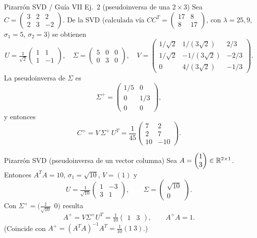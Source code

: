 \begin{ejemplo}{Pizarrón SVD / Guía VII Ej.\ 2 (pseudoinversa de una $2\times3$)}
Sea $C=\begin{pmatrix} 3 & 2 & 2 \\ 2 & 3 & -2 \end{pmatrix}$. De la SVD (calculada vía $CC^T=\begin{pmatrix}17&8\\8&17\end{pmatrix}$, con $\lambda=25,9$, $\sigma_1=5$, $\sigma_2=3$) se obtienen
\[
U=\tfrac1{\sqrt2}\begin{pmatrix} 1 & 1 \\ 1 & -1 \end{pmatrix},
\quad
\Sigma=\begin{pmatrix} 5 & 0 & 0 \\ 0 & 3 & 0 \end{pmatrix},
\quad
V=\begin{pmatrix} 1/\sqrt2 & 1/(3\sqrt2) & 2/3 \\ 1/\sqrt2 & -1/(3\sqrt2) & -2/3 \\ 0 & 4/(3\sqrt2) & -1/3 \end{pmatrix}.
\]
La pseudoinversa de $\Sigma$ es
\[
\Sigma^{+}=\begin{pmatrix} 1/5 & 0 \\ 0 & 1/3 \\ 0 & 0 \end{pmatrix},
\]
y entonces
\[
C^{+}=V\,\Sigma^{+}\,U^T=\frac{1}{45}\begin{pmatrix} 7 & 2 \\ 2 & 7 \\ 10 & -10 \end{pmatrix}.
\]
\end{ejemplo}

\begin{ejemplo}{Pizarrón SVD (pseudoinversa de un vector columna)}
Sea $A=\begin{pmatrix}1\\3\end{pmatrix}\in\mathbb{R}^{2\times1}$. Entonces $A^TA=10$, $\sigma_1=\sqrt{10}$, $V=(1)$ y
\[
U=\tfrac1{\sqrt{10}}\begin{pmatrix} 1 & -3 \\ 3 & 1 \end{pmatrix},
\qquad
\Sigma=\begin{pmatrix}\sqrt{10}\\0\end{pmatrix}.
\]
Con $\Sigma^{+}=\big(\tfrac1{\sqrt{10}}\ \ 0\big)$ resulta
\[
A^{+}=V\Sigma^{+}U^T=\tfrac{1}{10}\begin{pmatrix}1 & 3\end{pmatrix},
\qquad A^{+}A=1 .
\]
(Coincide con $A^+=(A^TA)^{-1}A^T=\tfrac1{10}(1\ 3)$.)
\end{ejemplo}

